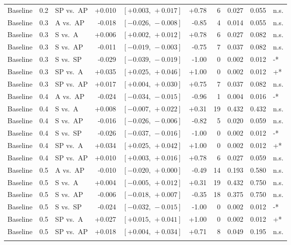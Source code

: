 \begin{landscape}
\begin{scriptsize}
\begin{longtable}{lllrrrrrrl}
Baseline & 0.2 & SP vs.\ AP & +0.010 & $[+0.003,\,+0.017]$ & +0.78 & 6 & 0.027 & 0.055 & n.s. \\
Baseline & 0.3 & A vs.\ AP & -0.018 & $[-0.026,\,-0.008]$ & -0.85 & 4 & 0.014 & 0.055 & n.s. \\
Baseline & 0.3 & S vs.\ A & +0.006 & $[+0.002,\,+0.012]$ & +0.78 & 6 & 0.027 & 0.082 & n.s. \\
Baseline & 0.3 & S vs.\ AP & -0.011 & $[-0.019,\,-0.003]$ & -0.75 & 7 & 0.037 & 0.082 & n.s. \\
Baseline & 0.3 & S vs.\ SP & -0.029 & $[-0.039,\,-0.019]$ & -1.00 & 0 & 0.002 & 0.012 & -* \\
Baseline & 0.3 & SP vs.\ A & +0.035 & $[+0.025,\,+0.046]$ & +1.00 & 0 & 0.002 & 0.012 & +* \\
Baseline & 0.3 & SP vs.\ AP & +0.017 & $[+0.004,\,+0.030]$ & +0.75 & 7 & 0.037 & 0.082 & n.s. \\
Baseline & 0.4 & A vs.\ AP & -0.024 & $[-0.034,\,-0.015]$ & -0.96 & 1 & 0.004 & 0.016 & -* \\
Baseline & 0.4 & S vs.\ A & +0.008 & $[-0.007,\,+0.022]$ & +0.31 & 19 & 0.432 & 0.432 & n.s. \\
Baseline & 0.4 & S vs.\ AP & -0.016 & $[-0.026,\,-0.006]$ & -0.82 & 5 & 0.020 & 0.059 & n.s. \\
Baseline & 0.4 & S vs.\ SP & -0.026 & $[-0.037,\,-0.016]$ & -1.00 & 0 & 0.002 & 0.012 & -* \\
Baseline & 0.4 & SP vs.\ A & +0.034 & $[+0.025,\,+0.042]$ & +1.00 & 0 & 0.002 & 0.012 & +* \\
Baseline & 0.4 & SP vs.\ AP & +0.010 & $[+0.003,\,+0.016]$ & +0.78 & 6 & 0.027 & 0.059 & n.s. \\
Baseline & 0.5 & A vs.\ AP & -0.010 & $[-0.020,\,+0.000]$ & -0.49 & 14 & 0.193 & 0.580 & n.s. \\
Baseline & 0.5 & S vs.\ A & +0.004 & $[-0.005,\,+0.012]$ & +0.31 & 19 & 0.432 & 0.750 & n.s. \\
Baseline & 0.5 & S vs.\ AP & -0.006 & $[-0.018,\,+0.007]$ & -0.35 & 18 & 0.375 & 0.750 & n.s. \\
Baseline & 0.5 & S vs.\ SP & -0.024 & $[-0.032,\,-0.015]$ & -1.00 & 0 & 0.002 & 0.012 & -* \\
Baseline & 0.5 & SP vs.\ A & +0.027 & $[+0.015,\,+0.041]$ & +1.00 & 0 & 0.002 & 0.012 & +* \\
Baseline & 0.5 & SP vs.\ AP & +0.018 & $[+0.004,\,+0.034]$ & +0.71 & 8 & 0.049 & 0.195 & n.s. \\
\addlinespace
\bottomrule
\end{longtable}
\end{scriptsize}
\end{landscape}
